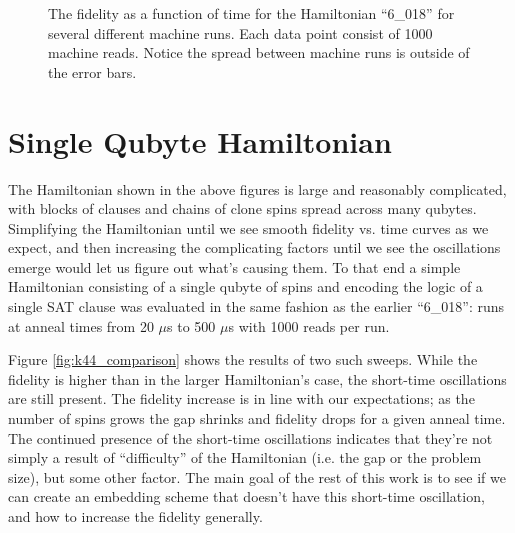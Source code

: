 \begin{figure}
	\caption[Short Time Fidelities]{The fidelity as a function of time for the Hamiltonian ``6\_018'' for several different machine runs.  Each data point consist of 1000 machine reads.  Notice the spread between machine runs is outside of the error bars.}
	\label{fig:short_fidelity}
\end{figure}

\section{Single Qubyte Hamiltonian}
The Hamiltonian shown in the above figures is large and reasonably complicated, with blocks of clauses and chains of clone spins spread across many qubytes.  Simplifying the Hamiltonian until we see smooth fidelity vs. time curves as we expect, and then increasing the complicating factors until we see the oscillations emerge would let us figure out what's causing them.  To that end a simple Hamiltonian consisting of a single qubyte of spins and encoding the logic of a single SAT clause was evaluated in the same fashion as the earlier ``6\_018'': runs at anneal times from 20 $\mu$s to 500 $\mu$s with 1000 reads per run.  

Figure \ref{fig:k44_comparison} shows the results of two such sweeps.  While the fidelity is higher than in the larger Hamiltonian's case, the short-time oscillations are still present.  The fidelity increase is in line with our expectations; as the number of spins grows the gap shrinks and fidelity drops for a given anneal time.  The continued presence of the short-time oscillations indicates that they're not simply a result of ``difficulty'' of the Hamiltonian (i.e. the gap or the problem size), but some other factor.
The main goal of the rest of this work is to see if we can create an embedding scheme that doesn't have this short-time oscillation, and how to increase the fidelity generally.

